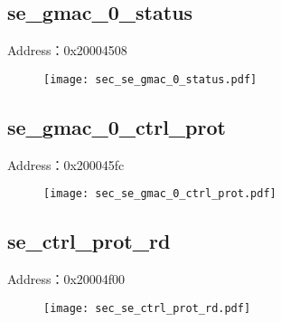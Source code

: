\subsection{se\_gmac\_0\_status}
\label{sec-se-gmac-0-status}
Address：0x20004508
 \begin{figure}[H]
\texttt{[image: sec\_se\_gmac\_0\_status.pdf]}
\end{figure}

\subsection{se\_gmac\_0\_ctrl\_prot}
\label{sec-se-gmac-0-ctrl-prot}
Address：0x200045fc
 \begin{figure}[H]
\texttt{[image: sec\_se\_gmac\_0\_ctrl\_prot.pdf]}
\end{figure}

\subsection{se\_ctrl\_prot\_rd}
\label{sec-se-ctrl-prot-rd}
Address：0x20004f00
 \begin{figure}[H]
\texttt{[image: sec\_se\_ctrl\_prot\_rd.pdf]}
\end{figure}

